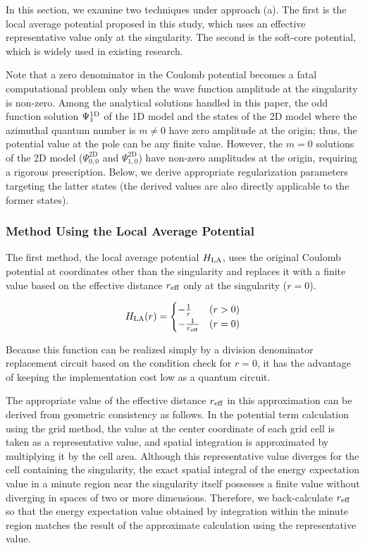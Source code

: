 \documentclass[report_2025.tex]{subfiles}
\begin{document}
In this section, we examine two techniques under approach (a). The first is the
local average potential proposed in this study, which uses an effective
representative value only at the singularity. The second is the soft-core
potential, which is widely used in existing research.

Note that a zero denominator in the Coulomb potential becomes a fatal
computational problem only when the wave function amplitude at the singularity
is non-zero. Among the analytical solutions handled in this paper, the odd
function solution $\Psi^{\mathrm{1D}}_1$ of the 1D model and the states of the 2D model
where the azimuthal quantum number is $m \neq 0$ have zero amplitude at the
origin; thus, the potential value at the pole can be any finite value. However,
the $m=0$ solutions of the 2D model ($\Psi_{0,0}^{\mathrm{2D}}$ and
$\Psi_{1,0}^{\mathrm{2D}}$) have non-zero amplitudes at the origin, requiring a
rigorous prescription. Below, we derive appropriate regularization parameters
targeting the latter states (the derived values are also directly applicable to
the former states).

\subsubsection{Method Using the Local Average Potential}

The first method, the local average potential $H_{\mathrm{LA}}$, uses the original Coulomb
potential at coordinates other than the singularity and replaces it with a
finite value based on the effective distance $r_{\mathrm{eff}}$ only at the singularity
($r=0$).

\begin{equation}
H_{\mathrm{LA}}(r) = \begin{cases}
-\frac{1}{r} & (r>0) \\
-\frac{1}{r_{\mathrm{eff}}} & (r=0)
\end{cases}\label{eq:Halr}
\end{equation}

Because this function can be realized simply by a division denominator
replacement circuit based on the condition check for $r=0$, it has the advantage
of keeping the implementation cost low as a quantum circuit.

The appropriate value of the effective distance $r_{\mathrm{eff}}$ in this approximation can
be derived from geometric consistency as follows. In the potential term
calculation using the grid method, the value at the center coordinate of each
grid cell is taken as a representative value, and spatial integration is
approximated by multiplying it by the cell area. Although this representative
value diverges for the cell containing the singularity, the exact spatial
integral of the energy expectation value in a minute region near the singularity
itself possesses a finite value without diverging in spaces of two or more
dimensions. Therefore, we back-calculate $r_{\mathrm{eff}}$ so that the energy expectation
value obtained by integration within the minute region matches the result of the
approximate calculation using the representative value.
\end{document}
